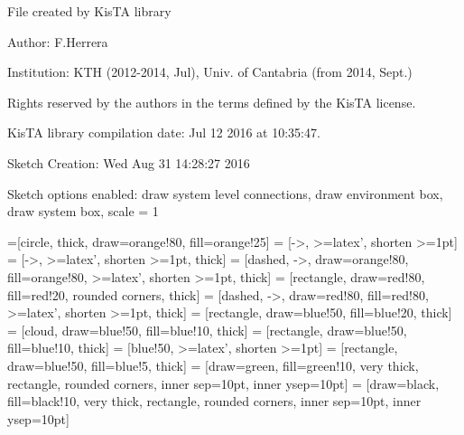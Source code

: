\documentclass[a4paper,10pt]{article}
\begin{document}
File created by KisTA library

Author: F.Herrera

Institution: KTH (2012-2014, Jul), Univ. of Cantabria (from 2014, Sept.)

Rights reserved by the authors in the terms defined by the KisTA license.

KisTA library compilation date: Jul 12 2016 at 10:35:47.



Sketch Creation: Wed Aug 31 14:28:27 2016


Sketch options enabled:
draw system level connections, draw environment box, draw system box, scale = 1
\hfill


=[circle, thick, draw=orange!80, fill=orange!25]
 = [->, >=latex', shorten >=1pt]
 = [->, >=latex', shorten >=1pt, thick]
 = [dashed, ->, draw=orange!80, fill=orange!80, >=latex', shorten >=1pt, thick]
 = [rectangle, draw=red!80, fill=red!20, rounded corners, thick]
 = [dashed, ->, draw=red!80, fill=red!80, >=latex', shorten >=1pt, thick]
 = [rectangle, draw=blue!50, fill=blue!20, thick]
 = [cloud, draw=blue!50, fill=blue!10, thick]
 = [rectangle, draw=blue!50, fill=blue!10, thick]
 = [blue!50, >=latex', shorten >=1pt]
 = [rectangle, draw=blue!50,  fill=blue!5, thick]
 = [draw=green, fill=green!10, very thick, rectangle, rounded corners, inner sep=10pt, inner ysep=10pt]
 = [draw=black, fill=black!10, very thick, rectangle, rounded corners, inner sep=10pt, inner ysep=10pt]
\end{document}
